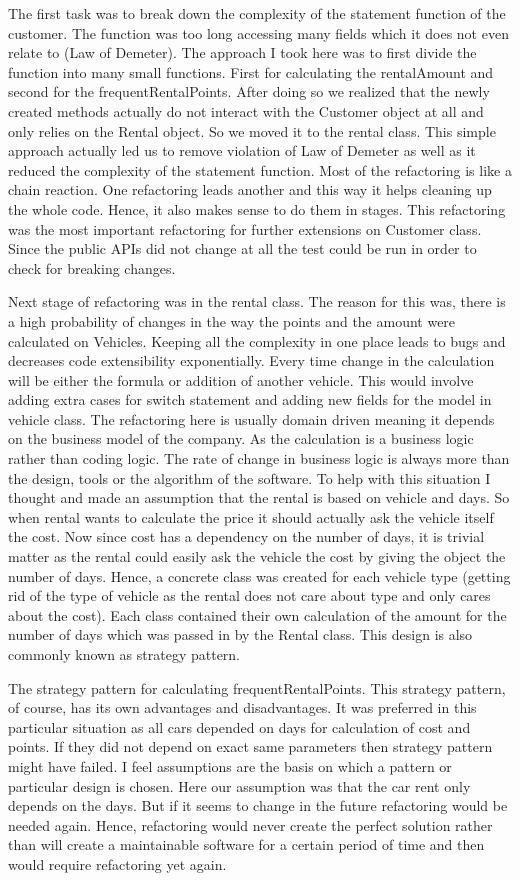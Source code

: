 \documentclass[11pt]{article}
\begin{document}
The first task was to break down the complexity of the statement function of the customer. The function was too long accessing many fields which it does not even relate to (Law of Demeter). The approach I took here was to first divide the function into many small functions. First for calculating the rentalAmount and second for the frequentRentalPoints. After doing so we realized that the newly created methods actually do not interact with the Customer object at all and only relies on the Rental object. So we moved it to the rental class. This simple approach actually led us to remove violation of Law of Demeter as well as it reduced the complexity of the statement function. Most of the refactoring is like a chain reaction. One refactoring leads another and this way it helps cleaning up the whole code. Hence, it also makes sense to do them in stages. This refactoring was the most important refactoring for further extensions on Customer class. Since the public APIs did not change at all the test could be run in order to check for breaking changes.

Next stage of refactoring was in the rental class. The reason for this was, there is a high probability of changes in the way the points and the amount were calculated on Vehicles. Keeping all the complexity in one place leads to bugs and decreases code extensibility exponentially. Every time change in the calculation will be either the formula or addition of another vehicle. This would involve adding extra cases for switch statement and adding new fields for the model in vehicle class. The refactoring here is usually domain driven meaning it depends on the business model of the company. As the calculation is a business logic rather than coding logic. The rate of change in business logic is always more than the design, tools or the algorithm of the software. To help with this situation I thought and made an assumption that the rental is based on vehicle and days. So when rental wants to calculate the price it should actually ask the vehicle itself the cost. Now since cost has a dependency on the number of days, it is trivial matter as the rental could easily ask the vehicle the cost by giving the object the number of days. Hence, a concrete class was created for each vehicle type (getting rid of the type of vehicle as the rental does not care about type and only cares about the cost). Each class contained their own calculation of the amount for the number of days which was passed in by the Rental class. This design is also commonly known as strategy pattern.

The strategy pattern for calculating frequentRentalPoints. This strategy pattern, of course, has its own advantages and disadvantages. It was preferred in this particular situation as all cars depended on days for calculation of cost and points. If they did not depend on exact same parameters then strategy pattern might have failed. I feel assumptions are the basis on which a pattern or particular design is chosen. Here our assumption was that the car rent only depends on the days. But if it seems to change in the future refactoring would be needed again. Hence, refactoring would never create the perfect solution rather than will create a maintainable software for a certain period of time and then would require refactoring yet again.
\end{document}
